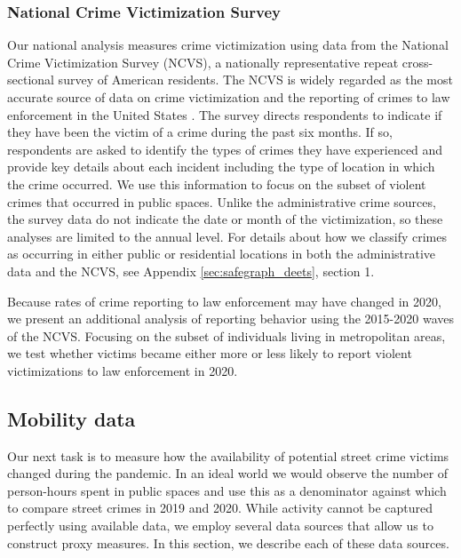 \documentclass[12pt]{article}
\begin{document}
\subsubsection{National Crime Victimization Survey}
Our national analysis measures crime victimization using data from the National Crime Victimization Survey (NCVS), a nationally representative repeat cross-sectional survey of American residents. The NCVS is widely regarded as the most accurate source of data on crime victimization and the reporting of crimes to law enforcement in the United States \citep{gutierrez2017silence}. The survey directs respondents to indicate if they have been the victim of a crime during the past six months. If so, respondents are asked to identify the types of crimes they have experienced and provide key details about each incident including the type of location in which the crime occurred. We use this information to focus on the subset of violent crimes that occurred in public spaces. Unlike the administrative crime sources, the survey data do not indicate the date or month of the victimization, so these analyses are limited to the annual level. For details about how we classify crimes as occurring in either public or residential locations in both the administrative data and the NCVS, see Appendix \ref{sec:safegraph_deets}, section 1.

Because rates of crime reporting to law enforcement may have changed in 2020, we present an additional analysis of reporting behavior using the 2015-2020 waves of the NCVS. Focusing on the subset of individuals living in metropolitan areas, we test whether victims became either more or less likely to report violent victimizations to law enforcement in 2020.

\subsection{Mobility data}
Our next task is to measure how the availability of potential street crime victims changed during the pandemic. In an ideal world we would observe the number of person-hours spent in public spaces and use this as a denominator against which to compare street crimes in 2019 and 2020. While activity cannot be captured perfectly using available data, we employ several data sources that allow us to construct proxy measures. In this section, we describe each of these data sources. 

\end{document}
